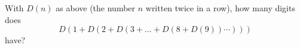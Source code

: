 With $D(n)$ as above (the number $n$ written twice in a row), how many digits does
\[D(1+D(2+D(3+\dots+D(8+D(9))\cdots)))\]
have?
